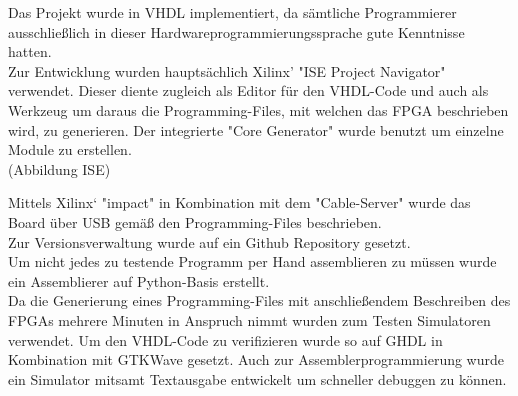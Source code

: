 Das Projekt wurde in VHDL implementiert, da s\"amtliche Programmierer ausschlie{\ss}lich in dieser Hardwareprogrammierungssprache gute Kenntnisse hatten.\\
Zur Entwicklung wurden haupts\"achlich Xilinx' "ISE Project Navigator" verwendet. Dieser diente zugleich als Editor f\"ur den VHDL-Code und auch als Werkzeug um daraus die Programming-Files, mit welchen das FPGA beschrieben wird, zu generieren. Der integrierte "Core Generator" wurde benutzt um einzelne Module zu erstellen.\\


(Abbildung ISE)



Mittels Xilinx‘ "impact" in Kombination mit dem "Cable-Server" wurde das Board \"uber USB gem\"a{\ss} den Programming-Files beschrieben.\\
Zur Versionsverwaltung wurde auf ein Github Repository gesetzt.\\ 
Um nicht jedes zu testende Programm per Hand assemblieren zu m\"ussen wurde ein Assemblierer auf Python-Basis erstellt.\\
Da die Generierung eines Programming-Files mit anschlie{\ss}endem Beschreiben des FPGAs mehrere Minuten in Anspruch nimmt wurden zum Testen Simulatoren verwendet. Um den VHDL-Code zu verifizieren wurde so auf GHDL in Kombination mit GTKWave gesetzt. Auch zur Assemblerprogrammierung wurde ein Simulator mitsamt Textausgabe entwickelt um schneller debuggen zu k\"onnen.
